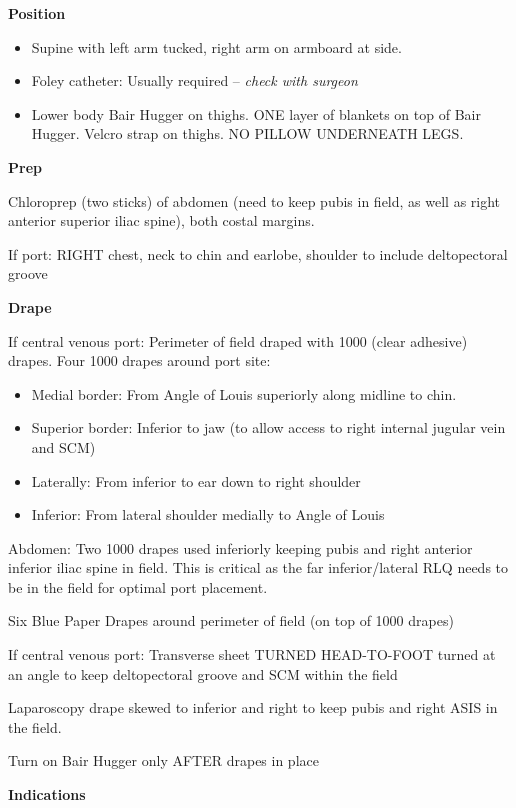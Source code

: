 \documentclass[
  letterpaper,
]{scrbook}
\providecommand{\tightlist}{%
  \setlength{\itemsep}{0pt}\setlength{\parskip}{0pt}}
\begin{document}
\textbf{Position}

\begin{itemize}
\tightlist
\item
  Supine with left arm tucked, right arm on armboard at side.
\item
  Foley catheter: Usually required -- \emph{check with surgeon}
\item
  Lower body Bair Hugger on thighs. ONE layer of blankets on top of Bair
  Hugger. Velcro strap on thighs. NO PILLOW UNDERNEATH LEGS.
\end{itemize}

\textbf{Prep}

Chloroprep (two sticks) of abdomen (need to keep pubis in field, as well
as right anterior superior iliac spine), both costal margins.

If port: RIGHT chest, neck to chin and earlobe, shoulder to include
deltopectoral groove

\textbf{Drape}

If central venous port: Perimeter of field draped with 1000 (clear
adhesive) drapes. Four 1000 drapes around port site:

\begin{itemize}
\tightlist
\item
  Medial border: From Angle of Louis superiorly along midline to chin.
\item
  Superior border: Inferior to jaw (to allow access to right internal
  jugular vein and SCM)
\item
  Laterally: From inferior to ear down to right shoulder
\item
  Inferior: From lateral shoulder medially to Angle of Louis
\end{itemize}

Abdomen: Two 1000 drapes used inferiorly keeping pubis and right
anterior inferior iliac spine in field. This is critical as the far
inferior/lateral RLQ needs to be in the field for optimal port
placement.

Six Blue Paper Drapes around perimeter of field (on top of 1000 drapes)

If central venous port: Transverse sheet TURNED HEAD-TO-FOOT turned at
an angle to keep deltopectoral groove and SCM within the field

Laparoscopy drape skewed to inferior and right to keep pubis and right
ASIS in the field.

Turn on Bair Hugger only AFTER drapes in place

\textbf{Indications}
\end{document}
